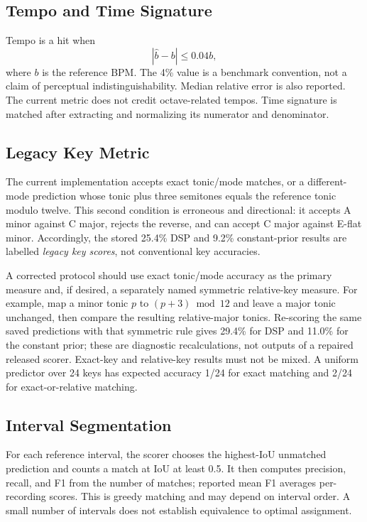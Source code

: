 \documentclass[11pt,a4paper]{article}
\begin{document}
\subsection{Tempo and Time Signature}
Tempo is a hit when
\begin{equation}
 |\widehat b-b|\leq 0.04b,
\end{equation}
where $b$ is the reference BPM. The 4\% value is a benchmark convention, not a claim of perceptual indistinguishability. Median relative error is also reported. The current metric does not credit octave-related tempos. Time signature is matched after extracting and normalizing its numerator and denominator.

\subsection{Legacy Key Metric}
\label{sec:key-metric}
The current implementation accepts exact tonic/mode matches, or a different-mode prediction whose tonic plus three semitones equals the reference tonic modulo twelve. This second condition is erroneous and directional: it accepts A minor against C major, rejects the reverse, and can accept C major against E-flat minor. Accordingly, the stored 25.4\% DSP and 9.2\% constant-prior results are labelled \emph{legacy key scores}, not conventional key accuracies.

A corrected protocol should use exact tonic/mode accuracy as the primary measure and, if desired, a separately named symmetric relative-key measure. For example, map a minor tonic $p$ to $(p+3)\bmod 12$ and leave a major tonic unchanged, then compare the resulting relative-major tonics. Re-scoring the same saved predictions with that symmetric rule gives 29.4\% for DSP and 11.0\% for the constant prior; these are diagnostic recalculations, not outputs of a repaired released scorer. Exact-key and relative-key results must not be mixed. A uniform predictor over 24 keys has expected accuracy 1/24 for exact matching and 2/24 for exact-or-relative matching.

\subsection{Interval Segmentation}
For each reference interval, the scorer chooses the highest-IoU unmatched prediction and counts a match at IoU at least 0.5. It then computes precision, recall, and F1 from the number of matches; reported mean F1 averages per-recording scores. This is greedy matching and may depend on interval order. A small number of intervals does not establish equivalence to optimal assignment.
\end{document}
